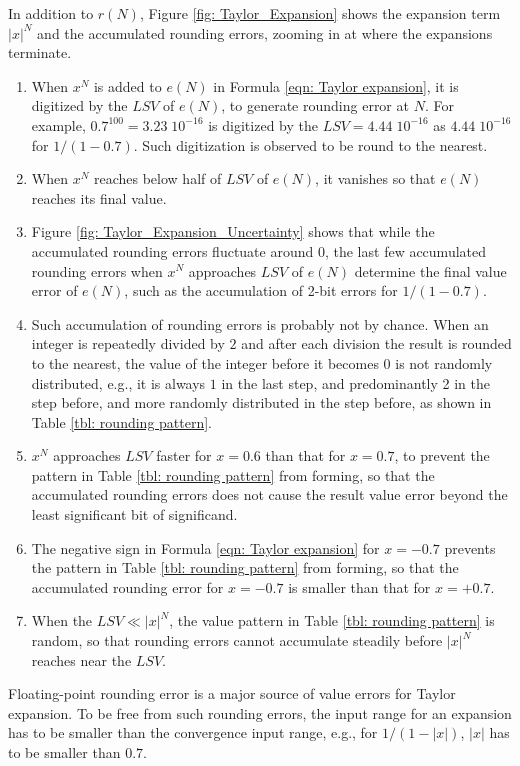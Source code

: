\documentclass[twoside]{article}
\numberwithin{equation}{section}
\begin{document}
In addition to $r(N)$, Figure \ref{fig: Taylor_Expansion} shows the expansion term $|x|^N$ and the accumulated rounding errors, zooming in at where the expansions terminate.
\begin{enumerate}
\item When $x^N$ is added to $e(N)$ in Formula \eqref{eqn: Taylor expansion}, it is digitized by the $LSV$ of $e(N)$, to generate rounding error at $N$.
For example, $0.7^{100}=3.23\; 10^{-16}$ is digitized by the $LSV=4.44\; 10^{-16}$ as $4.44\; 10^{-16}$ for $1/(1 - 0.7)$.
Such digitization is observed to be round to the nearest.

\item When $x^N$ reaches below half of $LSV$ of $e(N)$, it vanishes so that $e(N)$ reaches its final value.

\item Figure \ref{fig: Taylor_Expansion_Uncertainty} shows that while the accumulated rounding errors fluctuate around $0$, the last few accumulated rounding errors when $x^N$ approaches $LSV$ of $e(N)$ determine the final value error of $e(N)$, such as the accumulation of 2-bit errors for $1/(1 - 0.7)$.

\item Such accumulation of rounding errors is probably not by chance.
When an integer is repeatedly divided by $2$ and after each division the result is rounded to the nearest, the value of the integer before it becomes $0$ is not randomly distributed, e.g., it is always $1$ in the last step, and predominantly 2 in the step before, and more randomly distributed in the step before, as shown in Table \ref{tbl: rounding pattern}.

\item $x^N$ approaches $LSV$ faster for $x = 0.6$ than that for $x = 0.7$, to prevent the pattern in Table \ref{tbl: rounding pattern} from forming, so that the accumulated rounding errors does not cause the result value error beyond the least significant bit of significand.

\item The negative sign in Formula \eqref{eqn: Taylor expansion} for $x =-0.7$ prevents the pattern in Table \ref{tbl: rounding pattern} from forming, so that the accumulated rounding error for $x =-0.7$ is smaller than that for $x = +0.7$.

\item When the $LSV \ll |x|^N$, the value pattern in Table \ref{tbl: rounding pattern} is random, so that rounding errors cannot accumulate steadily before $|x|^N$ reaches near the $LSV$.

\end{enumerate}
Floating-point rounding error is a major source of value errors for Taylor expansion.
To be free from such rounding errors, the input range for an expansion has to be smaller than the convergence input range, e.g., for $1/(1 -|x|)$, $|x|$ has to be smaller than $0.7$.
\end{document}
